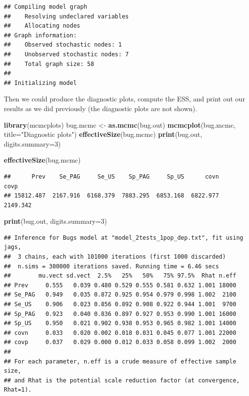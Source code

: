 \documentclass[
]{book}
\newenvironment{Shaded}{\begin{snugshade}}{\end{snugshade}}
\newcommand{\AttributeTok}[1]{\textcolor[rgb]{0.13,0.29,0.53}{#1}}
\newcommand{\DecValTok}[1]{\textcolor[rgb]{0.00,0.00,0.81}{#1}}
\newcommand{\FunctionTok}[1]{\textcolor[rgb]{0.13,0.29,0.53}{\textbf{#1}}}
\newcommand{\NormalTok}[1]{#1}
\newcommand{\OtherTok}[1]{\textcolor[rgb]{0.56,0.35,0.01}{#1}}
\newcommand{\StringTok}[1]{\textcolor[rgb]{0.31,0.60,0.02}{#1}}
\begin{document}
\begin{verbatim}
## Compiling model graph
##    Resolving undeclared variables
##    Allocating nodes
## Graph information:
##    Observed stochastic nodes: 1
##    Unobserved stochastic nodes: 7
##    Total graph size: 58
## 
## Initializing model
\end{verbatim}

Then we could produce the diagnostic plots, compute the ESS, and print out our results as we did previously (the diagnostic plots are not shown).

\begin{Shaded}
\begin{Highlighting}[]
\FunctionTok{library}\NormalTok{(mcmcplots)}
\NormalTok{bug.mcmc }\OtherTok{\textless{}{-}} \FunctionTok{as.mcmc}\NormalTok{(bug.out)          }
\FunctionTok{mcmcplot}\NormalTok{(bug.mcmc, }\AttributeTok{title=}\StringTok{"Diagnostic plots"}\NormalTok{) }
\FunctionTok{effectiveSize}\NormalTok{(bug.mcmc)}
\FunctionTok{print}\NormalTok{(bug.out, }\AttributeTok{digits.summary=}\DecValTok{3}\NormalTok{) }
\end{Highlighting}
\end{Shaded}

\begin{Shaded}
\begin{Highlighting}[]
\FunctionTok{effectiveSize}\NormalTok{(bug.mcmc)}
\end{Highlighting}
\end{Shaded}

\begin{verbatim}
##      Prev    Se_PAG     Se_US    Sp_PAG     Sp_US      covn      covp 
## 15812.487  2167.916  6168.379  7883.295  6853.168  6822.977  2149.342
\end{verbatim}

\begin{Shaded}
\begin{Highlighting}[]
\FunctionTok{print}\NormalTok{(bug.out, }\AttributeTok{digits.summary=}\DecValTok{3}\NormalTok{) }
\end{Highlighting}
\end{Shaded}

\begin{verbatim}
## Inference for Bugs model at "model_2tests_1pop_dep.txt", fit using jags,
##  3 chains, each with 101000 iterations (first 1000 discarded)
##  n.sims = 300000 iterations saved. Running time = 6.46 secs
##        mu.vect sd.vect  2.5%   25%   50%   75% 97.5%  Rhat n.eff
## Prev     0.555   0.039 0.480 0.529 0.555 0.581 0.632 1.001 18000
## Se_PAG   0.949   0.035 0.872 0.925 0.954 0.979 0.998 1.002  2100
## Se_US    0.906   0.023 0.856 0.892 0.908 0.922 0.944 1.001  9700
## Sp_PAG   0.923   0.040 0.836 0.897 0.927 0.953 0.990 1.001 16000
## Sp_US    0.950   0.021 0.902 0.938 0.953 0.965 0.982 1.001 14000
## covn     0.033   0.020 0.002 0.018 0.031 0.045 0.077 1.001 22000
## covp     0.037   0.029 0.000 0.012 0.033 0.058 0.099 1.002  2000
## 
## For each parameter, n.eff is a crude measure of effective sample size,
## and Rhat is the potential scale reduction factor (at convergence, Rhat=1).
\end{verbatim}
\end{document}

